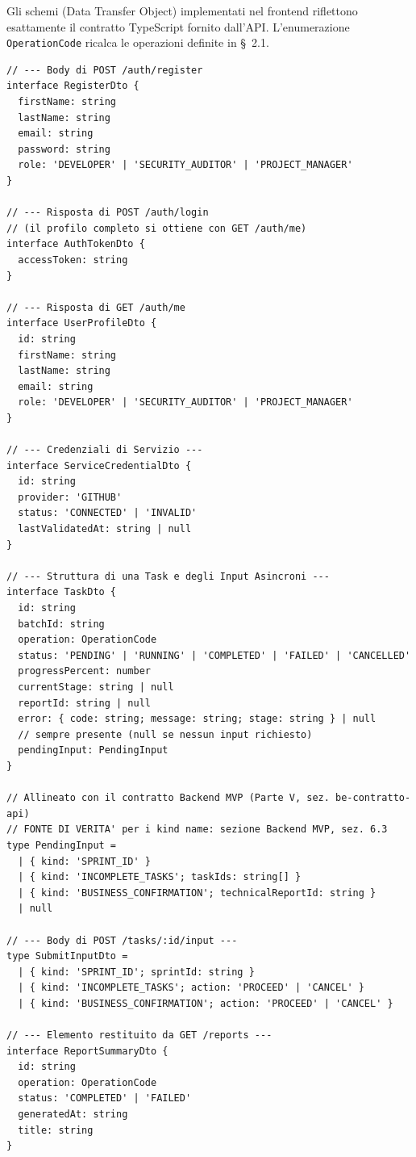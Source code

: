 \documentclass[11pt,a4paper]{article}
\begin{document}
Gli schemi (Data Transfer Object) implementati nel frontend riflettono esattamente il contratto TypeScript fornito dall'API. L'enumerazione \texttt{OperationCode} ricalca le operazioni definite in \S~2.1.

\begin{lstlisting}[caption={Schemi dei DTO necessari al frontend per l'MVP.}]
// --- Body di POST /auth/register
interface RegisterDto {
  firstName: string
  lastName: string
  email: string
  password: string
  role: 'DEVELOPER' | 'SECURITY_AUDITOR' | 'PROJECT_MANAGER'
}

// --- Risposta di POST /auth/login
// (il profilo completo si ottiene con GET /auth/me)
interface AuthTokenDto {
  accessToken: string
}

// --- Risposta di GET /auth/me
interface UserProfileDto {
  id: string
  firstName: string
  lastName: string
  email: string
  role: 'DEVELOPER' | 'SECURITY_AUDITOR' | 'PROJECT_MANAGER'
}

// --- Credenziali di Servizio ---
interface ServiceCredentialDto {
  id: string
  provider: 'GITHUB'
  status: 'CONNECTED' | 'INVALID'
  lastValidatedAt: string | null
}

// --- Struttura di una Task e degli Input Asincroni ---
interface TaskDto {
  id: string
  batchId: string
  operation: OperationCode
  status: 'PENDING' | 'RUNNING' | 'COMPLETED' | 'FAILED' | 'CANCELLED'
  progressPercent: number
  currentStage: string | null
  reportId: string | null
  error: { code: string; message: string; stage: string } | null
  // sempre presente (null se nessun input richiesto)
  pendingInput: PendingInput
}

// Allineato con il contratto Backend MVP (Parte V, sez. be-contratto-api)
// FONTE DI VERITA' per i kind name: sezione Backend MVP, sez. 6.3
type PendingInput =
  | { kind: 'SPRINT_ID' }
  | { kind: 'INCOMPLETE_TASKS'; taskIds: string[] }
  | { kind: 'BUSINESS_CONFIRMATION'; technicalReportId: string }
  | null

// --- Body di POST /tasks/:id/input ---
type SubmitInputDto =
  | { kind: 'SPRINT_ID'; sprintId: string }
  | { kind: 'INCOMPLETE_TASKS'; action: 'PROCEED' | 'CANCEL' }
  | { kind: 'BUSINESS_CONFIRMATION'; action: 'PROCEED' | 'CANCEL' }

// --- Elemento restituito da GET /reports ---
interface ReportSummaryDto {
  id: string
  operation: OperationCode
  status: 'COMPLETED' | 'FAILED'
  generatedAt: string
  title: string
}
\end{lstlisting}
\end{document}
